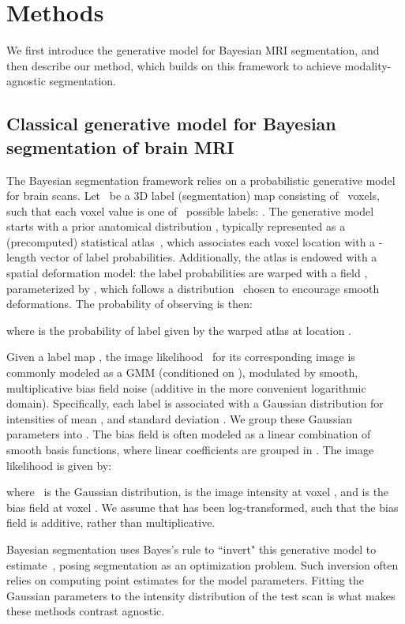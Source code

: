 \documentclass{midl}
\begin{document}
\section{Methods}

We first introduce the generative model for Bayesian MRI segmentation, and then describe our method, which builds on this framework to achieve modality-agnostic segmentation.

\subsection{Classical generative model for Bayesian segmentation of brain MRI}
\label{bayesian}

The Bayesian segmentation framework relies on a probabilistic generative model for brain  scans. Let~ be a 3D label (segmentation) map consisting of~ voxels, such that each voxel value  is one of~ possible labels: . The generative model starts with a prior anatomical distribution , typically represented as a (precomputed) statistical atlas~, which associates each voxel location with a -length vector of label probabilities. Additionally, the atlas  is endowed with a spatial deformation model: the label probabilities are warped with a field , parameterized by , which follows a distribution~ chosen to encourage smooth deformations. The probability of observing  is then:

where  is the probability of label  given by the warped atlas at location . 

Given a label map , the image likelihood~ for its corresponding image  is commonly modeled as a GMM (conditioned on ), modulated by smooth, multiplicative bias field noise (additive in the more convenient logarithmic domain). Specifically, each label  is associated with a Gaussian distribution for intensities of mean , and standard deviation . We group these Gaussian parameters into . The bias field is often modeled as a linear combination of smooth basis functions, where linear coefficients are grouped in  \cite{larsen_n3_2014}. The image likelihood is given by:

where~ is the Gaussian distribution,  is the image intensity at voxel , and  is the bias field at voxel . We assume that  has been log-transformed, such that the bias field is additive, rather than multiplicative.

Bayesian segmentation uses Bayes's rule to ``invert" this generative model to estimate~, posing segmentation as an optimization problem. Such inversion often relies on computing point estimates for the model parameters. Fitting the Gaussian parameters  to the intensity distribution of the test scan is what makes these methods contrast agnostic.
\end{document}

